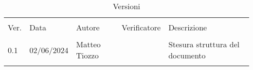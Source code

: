 \documentclass[italian,12pt]{article} %
\begin{document}


\newpage



\begin{table}[!h]
	\caption*{Versioni}
	\begin{center}
		\begin{tabular}{ l l l l l }
			\hline                                                                             \\[-2ex]
			Ver. & Data       & Autore        & Verificatore & Descrizione                     \\
			\hline                                                                             \\[-1.5ex]
			0.1  & 02/06/2024 & Matteo Tiozzo &              & Stesura struttura del documento \\
			\\[-1.5ex] \hline
		\end{tabular}
	\end{center}
\end{table}

\newpage

\tableofcontents

\newpage

\listoftables

\listoffigures

\lstlistoflistings

\newpage




\newpage



\newpage



\newpage

% 



\end{document}
